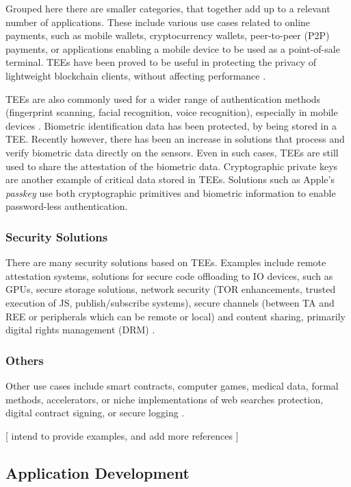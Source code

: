 \documentclass[runningheads,a4paper]{uwsese}
\begin{document}
Grouped here there are smaller categories, that together add up to a relevant
number of applications. These include various use cases related to online
payments, such as mobile wallets, cryptocurrency wallets, peer-to-peer (P2P)
payments, or applications enabling a mobile device to be used as a
point-of-sale terminal. TEEs have been proved to be useful in protecting the
privacy of lightweight blockchain clients, without affecting performance
\cite{light_blockchain}.

TEEs are also commonly used for a wider range of authentication methods
(fingerprint scanning, facial recognition, voice recognition), especially in
mobile devices \cite{tee_in_android}. Biometric identification data has been
protected, by being stored in a TEE. Recently however, there has been an
increase in solutions that process and verify biometric data directly on the
sensors. Even in such cases, TEEs are still used to share the attestation of
the biometric data. Cryptographic private keys are another example of critical
data stored in TEEs. Solutions such as Apple's \emph{passkey}
\cite{apple_passkey} use both cryptographic primitives and biometric
information to enable password-less authentication.

\subsubsection{Security Solutions}

There are many security solutions based on TEEs. Examples include remote
attestation systems, solutions for secure code offloading to IO devices, such
as GPUs, secure storage solutions, network security (TOR enhancements, trusted
execution of JS, publish/subscribe systems), secure channels (between TA and
REE or peripherals which can be remote or local) and content sharing, primarily
digital rights management (DRM) \cite{tee_app_rev}.

\subsubsection{Others}

Other use cases include smart contracts, computer games, medical data, formal
methods, accelerators, or niche implementations of web searches protection, 
digital contract signing, or secure logging \cite{tee_app_rev}.

[ intend to provide examples, and add more references ]

\subsection{Application Development}
\end{document}
